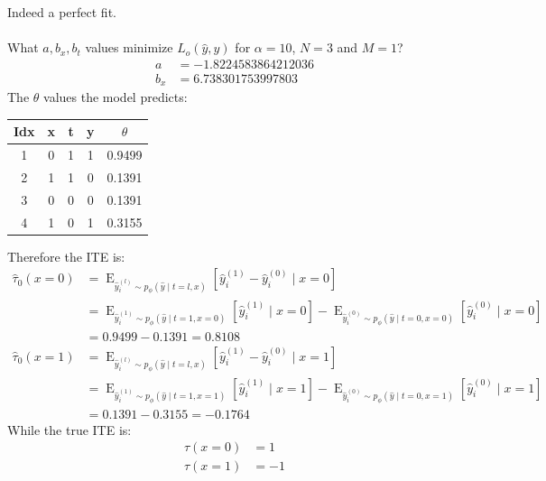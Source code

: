 \documentclass[oneside,12pt]{article}
\begin{document}
%
Indeed a perfect fit.\\\\
%
What $a,b_x,b_t$ values minimize $L_o(\hat{y}, y)$ for $\alpha=10$, $N=3$ and $M=1$?
%
\begin{equation}
    \begin{split}
        a &= -1.8224583864212036\\
        b_x &= 6.738301753997803
    \end{split}
\end{equation}
%
The $\theta$ values the model predicts:
%
\begin{center}
 \begin{tabular}{||c | c | c | c | c ||}
 \hline
 Idx & x & t & y & $\theta$ \\ [0.5ex] 
 \hline\hline
 1 & 0 & 1 & 1 & 0.9499 \\ 
 \hline
 2 & 1 & 1 & 0 & 0.1391 \\
 \hline
 3 & 0 & 0 & 0 & 0.1391 \\
 \hline
 4 & 1 & 0 & 1 & 0.3155 \\ [1ex] 
 \hline
\end{tabular}
\end{center}
%
Therefore the ITE is:
%
\begin{equation}
    \begin{split}
        \hat{\tau}_0(x=0) &= \operatorname{E}_{\hat{y}_i^{(l)} \sim p_\phi(\hat{y} \mid t=l,x)}\left[\hat{y}_i^{(1)}-\hat{y}_i^{(0)} \mid x=0 \right]\\
        &= \operatorname{E}_{\hat{y}_i^{(1)} \sim p_\phi(\hat{y} \mid t=1,x=0)}\left[\hat{y}_i^{(1)} \mid x=0 \right] - \operatorname{E}_{\hat{y}_i^{(0)} \sim p_\phi(\hat{y} \mid t=0,x=0)}\left[\hat{y}_i^{(0)} \mid x=0 \right]\\
        &= 0.9499 - 0.1391 = 0.8108\\
        \hat{\tau}_0(x=1) &= \operatorname{E}_{\hat{y}_i^{(l)} \sim p_\phi(\hat{y} \mid t=l,x)}\left[\hat{y}_i^{(1)}-\hat{y}_i^{(0)} \mid x=1 \right]\\
        &= \operatorname{E}_{\hat{y}_i^{(1)} \sim p_\phi(\hat{y} \mid t=1,x=1)}\left[\hat{y}_i^{(1)} \mid x=1 \right] - \operatorname{E}_{\hat{y}_i^{(0)} \sim p_\phi(\hat{y} \mid t=0,x=1)}\left[\hat{y}_i^{(0)} \mid x=1 \right]\\
        &= 0.1391 - 0.3155 = -0.1764    
    \end{split}
\end{equation}
%
While the true ITE is:
\begin{equation}
    \begin{split}
        \tau(x=0) &= 1\\
        \tau(x=1) &= -1
    \end{split}
\end{equation}
\end{document}
